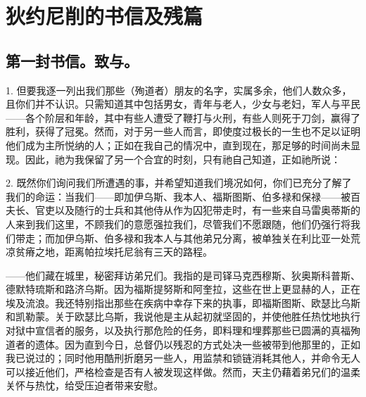 
\chapter{狄约尼削的书信及残篇}



\section{第一封书信。致与。}

1. 但要我逐一列出我们那些（殉道者）朋友的名字，实属多余，他们人数众多，且你们并不认识。只需知道其中包括男女，青年与老人，少女与老妇，军人与平民——各个阶层和年龄，其中有些人遭受了鞭打与火刑，有些人则死于刀剑，赢得了胜利，获得了冠冕。然而，对于另一些人而言，即使度过极长的一生也不足以证明他们成为主所悦纳的人；正如在我自己的情况中，直到现在，那足够的时间尚未显现。因此，祂为我保留了另一个合宜的时刻，只有祂自己知道，正如祂所说：\par

2. 既然你们询问我们所遭遇的事，并希望知道我们境况如何，你们已充分了解了我们的命运：当我们——即加伊乌斯、我本人、福斯图斯、伯多禄和保禄——被百夫长、官吏以及随行的士兵和其他侍从作为囚犯带走时，有一些来自马雷奥蒂斯的人来到我们这里，不顾我们的意愿强拉我们，尽管我们不愿跟随，他们仍强行将我们带走；而加伊乌斯、伯多禄和我本人与其他弟兄分离，被单独关在利比亚一处荒凉贫瘠之地，距离帕拉埃托尼翁有三天的路程。\par

——他们藏在城里，秘密拜访弟兄们。我指的是司铎马克西穆斯、狄奥斯科普斯、德默特琉斯和路济乌斯。因为福斯提努斯和阿奎拉，这些在世上更显赫的人，正在埃及流浪。我还特别指出那些在疾病中幸存下来的执事，即福斯图斯、欧瑟比乌斯和凯勒蒙。关于欧瑟比乌斯，我说他是主从起初就坚固的，并使他胜任热忱地执行对狱中宣信者的服务，以及执行那危险的任务，即料理和埋葬那些已圆满的真福殉道者的遗体。因为直到今日，总督仍以残忍的方式处决一些被带到他那里的，正如我已说过的；同时他用酷刑折磨另一些人，用监禁和锁链消耗其他人，并命令无人可以接近他们，严格检查是否有人被发现这样做。然而，天主仍藉着弟兄们的温柔关怀与热忱，给受压迫者带来安慰。\par


